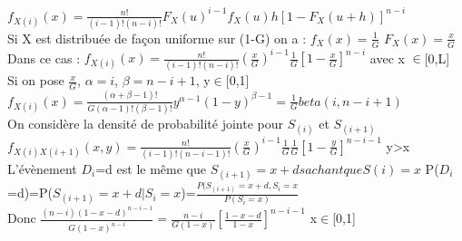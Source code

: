 \documentclass[11pt,a4paper]{article} %
\begin{document}
$f_{X(i)}(x) = \frac{n!}{(i-1)!(n-i)!} F_X(u)^{i-1}f_X(u)h[1-F_X(u+h)]^{n-i}$\\
Si X est distribuée de façon uniforme sur (1-G) on a :
$f_X(x)=\frac{1}{G}$  $F_X(x)=\frac{x}{G}$\\
Dans ce cas : 
$f_{X(i)}(x) = \frac{n!}{(i-1)!(n-i)!} (\frac{x}{G})^{i-1} \frac{1}{G} [1-\frac{x}{G}]^{n-i}$ avec x $ \in $[0,L]                                                                                                                                                                                                                                                                                                                                                                                                                                                                                                                                                                                                                                                       
\\Si on pose $ \frac{x}{G}$, $\alpha=i$, $\beta=n-i+1$, y$\in$[0,1]                                                                                                                                                                                                                                                                                                                                                                                                                                                                                                                                                                                                                                                    \\ 
$f_{X(i)}(x)= \frac{(\alpha+\beta-1)!}{G(\alpha-1)!(\beta-1)!}y^{\alpha-1}(1-y)^{\beta-1}=\frac{1}{G}beta(i,n-i+1) $\\
On considère la densité de probabilité jointe pour $S_(i)$ et $S_{(i+1)}$\\
$f_{X(i)X(i+1)}(x,y) = \frac{n!}{(i-1)!(n-i-1)!} (\frac{x}{G})^{i-1} \frac{1}{G} \frac{1}{G}[1-\frac{y}{G}]^{n-i-1}$ y>x\\
L'évènement $D_i$=d est le même que $S_{(i+1)}=x+d sachant que S(i)=x$
P($D_i$=d)=P($S_{(i+1)}=x+d|S_i=x $)=$\frac{P(S_{(i+1)}=x+d,S_i=x}{P(S_i=x)} $\\
Donc $\frac{(n-i)(1-x-d)^{n-i-1}}{G(1-x)^{n-i}}=\frac{n-i}{G(1-x)}[\frac{1-x-d}{1-x}]^{n-i-1}$ x$\in$[0,1]                                                                                                                                                                                                                                                                                                                                                                                                                                                                                                                                                                                                                                                   
\end{document}
